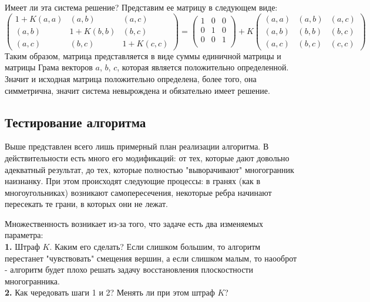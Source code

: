\documentclass[a4paper,12pt, titlepage]{article}
\begin{document}
\begin{flushleft}
 Имеет ли эта система решение? Представим ее матрицу в следующем виде:
 $$
  \begin{pmatrix}
    1 + K (a, a) & (a, b) & (a, c)\\
    (a, b) & 1 + K (b, b) & (b, c)\\
    (a, c) & (b, c) & 1 + K (c, c)
  \end{pmatrix} = 
  \begin{pmatrix}
    1 & 0 & 0\\
    0 & 1 & 0\\
    0 & 0 & 1\\
  \end{pmatrix} + K
  \begin{pmatrix}
    (a, a) & (a, b) & (a, c)\\
    (a, b) & (b, b) & (b, c)\\
    (a, c) & (b, c) & (c, c)
  \end{pmatrix}
$$
Таким образом, матрица представляется в виде суммы единичной матрицы и матрицы Грама векторов
$a$, $b$, $c$, которая является положительно определенной. Значит и исходная матрица положительно
определена, более того, она симметрична, значит система невырождена и обязательно имеет решение.
\end{flushleft}

\subsection{Тестирование алгоритма}
\begin{flushleft}
Выше представлен всего лишь примерный план реализации алгоритма. В действительности есть много его модификаций: от
тех, которые дают довольно адекватный результат, до тех, которые полностью "выворачивают" многогранник 
наизнанку. При этом происходят следующие процессы: в гранях (как в многоугольниках) возникают 
самопересечения, некоторые ребра начинают пересекать те грани, в которых они не лежат.
\end{flushleft}
\begin{flushleft}
Множественность возникает из-за того, что задаче есть два изменяемых параметра:\\
	\textbf{1. }Штраф $K$. Каким его сделать? Если слишком большим, то алгоритм перестанет 
"чувствовать" смещения вершин, а если слишком малым, то наооброт - алгоритм будет плохо решать задачу
восстановления плоскостности многогранника.\\
	\textbf{2. }Как чередовать шаги 1 и 2? Менять ли при этом штраф $K$?\\
\end{flushleft}
\end{document}
